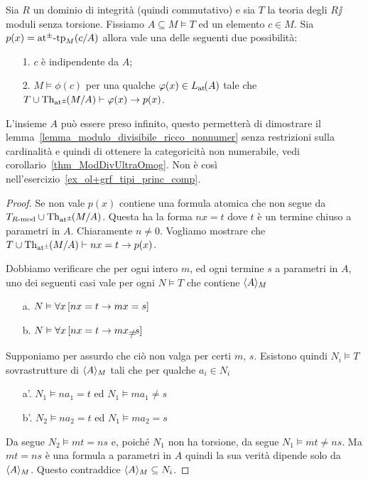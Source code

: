 \begin{proposition}\label{prop_mst_tipi princ_comp}
Sia $R$ un dominio di integrit\`a (quindi commutativo) e sia $T$ la teoria degli $R\jj$moduli senza torsione. Fissiamo $A\subseteq M\models T$ ed un elemento $c\in M$. Sia $p(x)={\tiny\rm at^\pm}\textrm{-tp}_M(c/A)$ allora vale una delle seguenti due possibilit\`a:   
\begin{itemize}
\item[1.] $c$ \`e indipendente da $A$;
\item[2.] $M\models\phi(c)$ per una qualche $\varphi(x)\in L_{\tiny\rm at}\hskip-.3ex(A)$ tale che 
$T\cup\textrm{Th}_{{\tiny\rm at^\pm}}\hskip-.3ex(M/A)\vdash\varphi(x)\rightarrow p(x)$.
\end{itemize}\end{proposition}

L'insieme $A$ pu\`o essere preso infinito, questo permetter\`a di dimostrare il lemma~\ref{lemma_modulo_divisibile_ricco_nonnumer} senza restrizioni sulla cardinalit\`a e quindi di ottenere la categoricit\`a non numerabile, vedi corollario~\ref{thm_ModDivUltraOmog}. Non \`e cos\`i nell'esercizio~\ref{ex_ol+grf_tipi_princ_comp}. 

\begin{proof}
Se  non vale $p(x)$ contiene una formula atomica che non segue da $T_{\mbox{\scriptsize $R$-mod}}\cup\textrm{Th}_{{\tiny\rm at^\pm}}\hskip-.3ex(M/A)$. Questa ha la forma $nx=t$ dove $t$ \`e un termine chiuso a parametri in $A$. Chiaramente $n\neq 0$. Vogliamo mostrare che $T\cup\textrm{Th}_{{\tiny\rm at^\pm}}\hskip-.3ex(M/A)\vdash nx=t\rightarrow p(x)$.

Dobbiamo verificare che per ogni intero $m$, ed ogni termine $s$ a parametri in $A$, uno dei seguenti casi vale per ogni $N\models T$ che contiene $\langle A\rangle_M$
\begin{itemize}
\item[a.] $N\vDash\forall x\,[nx=t\rightarrow mx=s]$
\item[b.] $N\models\A x\,[nx=t\imp mx\neq s]$
\end{itemize} 
Supponiamo per assurdo che ci\`o non valga per certi $m$, $s$. Esistono quindi $N_i\models T$ sovrastrutture di $\langle A\rangle_M$ tali che per qualche $a_i\in N_i$
\begin{itemize}
\item[a'.] $N_1\models na_1=t$ ed $N_1\models ma_1\neq s$
\item[b'.] $N_2\models na_2=t$ ed $N_1\models ma_2 = s$
\end{itemize} 
Da  segue $N_2\models mt=ns$ e, poich\'e $N_1$ non ha torsione, da  segue $N_1\models mt\neq ns$. Ma $mt=ns$ \`e una formula a parametri in $A$ quindi la sua verit\`a dipende solo da $\langle A\rangle_M$. Questo contraddice $\langle A\rangle_M\subseteq N_i$.
\end{proof}


